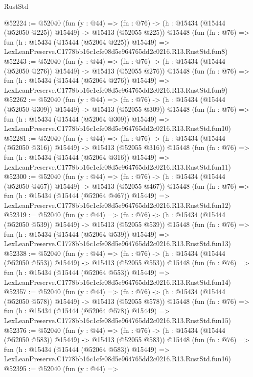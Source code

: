 \begin{lexlean}{RustStd}
\begin{coremodule}
@52224 := @52040
    (fun (y : @44) =>
    (fn : @76) -> (h : @15434 (@15444 (@52050 @225)) @15449) -> @15413 (@52055 @225))
    @15448
    (fun (fn : @76) =>
    fun (h : @15434 (@15444 (@52064 @225)) @15449) =>
    LexLeanPreserve.C1778bb16c1cfe08d5e964765dd2c0216.R13.RustStd.fun8)
@52243 := @52040
    (fun (y : @44) =>
    (fn : @76) -> (h : @15434 (@15444 (@52050 @276)) @15449) -> @15413 (@52055 @276))
    @15448
    (fun (fn : @76) =>
    fun (h : @15434 (@15444 (@52064 @276)) @15449) =>
    LexLeanPreserve.C1778bb16c1cfe08d5e964765dd2c0216.R13.RustStd.fun9)
@52262 := @52040
    (fun (y : @44) =>
    (fn : @76) -> (h : @15434 (@15444 (@52050 @309)) @15449) -> @15413 (@52055 @309))
    @15448
    (fun (fn : @76) =>
    fun (h : @15434 (@15444 (@52064 @309)) @15449) =>
    LexLeanPreserve.C1778bb16c1cfe08d5e964765dd2c0216.R13.RustStd.fun10)
@52281 := @52040
    (fun (y : @44) =>
    (fn : @76) -> (h : @15434 (@15444 (@52050 @316)) @15449) -> @15413 (@52055 @316))
    @15448
    (fun (fn : @76) =>
    fun (h : @15434 (@15444 (@52064 @316)) @15449) =>
    LexLeanPreserve.C1778bb16c1cfe08d5e964765dd2c0216.R13.RustStd.fun11)
@52300 := @52040
    (fun (y : @44) =>
    (fn : @76) -> (h : @15434 (@15444 (@52050 @467)) @15449) -> @15413 (@52055 @467))
    @15448
    (fun (fn : @76) =>
    fun (h : @15434 (@15444 (@52064 @467)) @15449) =>
    LexLeanPreserve.C1778bb16c1cfe08d5e964765dd2c0216.R13.RustStd.fun12)
@52319 := @52040
    (fun (y : @44) =>
    (fn : @76) -> (h : @15434 (@15444 (@52050 @539)) @15449) -> @15413 (@52055 @539))
    @15448
    (fun (fn : @76) =>
    fun (h : @15434 (@15444 (@52064 @539)) @15449) =>
    LexLeanPreserve.C1778bb16c1cfe08d5e964765dd2c0216.R13.RustStd.fun13)
@52338 := @52040
    (fun (y : @44) =>
    (fn : @76) -> (h : @15434 (@15444 (@52050 @553)) @15449) -> @15413 (@52055 @553))
    @15448
    (fun (fn : @76) =>
    fun (h : @15434 (@15444 (@52064 @553)) @15449) =>
    LexLeanPreserve.C1778bb16c1cfe08d5e964765dd2c0216.R13.RustStd.fun14)
@52357 := @52040
    (fun (y : @44) =>
    (fn : @76) -> (h : @15434 (@15444 (@52050 @578)) @15449) -> @15413 (@52055 @578))
    @15448
    (fun (fn : @76) =>
    fun (h : @15434 (@15444 (@52064 @578)) @15449) =>
    LexLeanPreserve.C1778bb16c1cfe08d5e964765dd2c0216.R13.RustStd.fun15)
@52376 := @52040
    (fun (y : @44) =>
    (fn : @76) -> (h : @15434 (@15444 (@52050 @583)) @15449) -> @15413 (@52055 @583))
    @15448
    (fun (fn : @76) =>
    fun (h : @15434 (@15444 (@52064 @583)) @15449) =>
    LexLeanPreserve.C1778bb16c1cfe08d5e964765dd2c0216.R13.RustStd.fun16)
@52395 := @52040
    (fun (y : @44) =>

\end{coremodule}
\end{lexlean}
